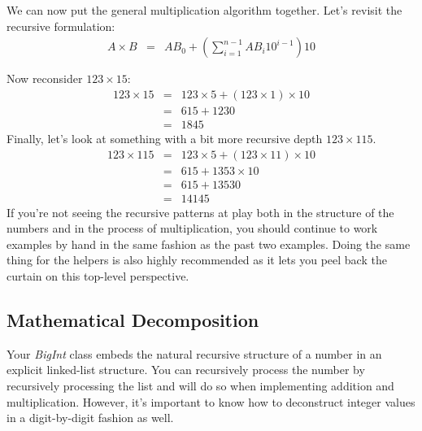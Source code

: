 \documentclass[10pt]{article}
\begin{document}
We can now put the general multiplication algorithm together. Let's revisit the recursive formulation:
\[
\begin{array}{rcl}
A \times B &=& AB_0 + \left(\sum\limits_{i=1}^{n-1}AB_i10^{i-1}\right)10 \\ \\ 
\end{array}
\] 
Now reconsider $123 \times 15$:
\[
\begin{array}{rcl}
123 \times 15 &=& 123\times 5 + (123\times 1)\times 10 \\
 &=& 615 + 1230 \\
 &=& 1845
\end{array}
\]
Finally, let's look at something with a bit more recursive depth $123 \times 115$.
\[
\begin{array}{rcl}
123 \times 115 &=& 123\times 5 + (123\times 11)\times 10 \\
 &=& 615 + 1353 \times 10 \\
 &=& 615 + 13530 \\
 &=& 14145
\end{array}
\]
If you're not seeing the recursive patterns at play both in the structure of the numbers and in the process of multiplication, you should continue to work examples by hand in the same fashion as the past two examples. Doing the same thing for the helpers is also highly recommended as it lets you peel back the curtain on this top-level perspective. 

\subsection*{Mathematical Decomposition}

Your \textit{BigInt} class embeds the natural recursive structure of a number in an explicit linked-list structure. You can recursively process the number by recursively processing the list and will do so when implementing addition and multiplication. However, it's important to know how to deconstruct integer values in a digit-by-digit fashion as well. 
\end{document}
